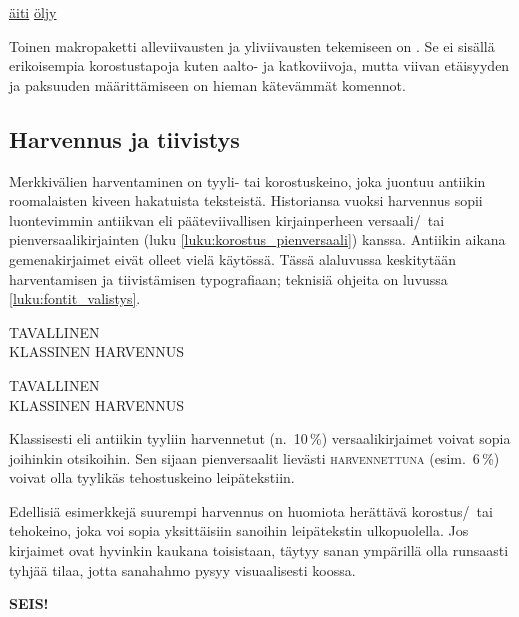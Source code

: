 \begin{tulossis}
  \setlength{\ULdepth}{.2ex}
  \renewcommand{\ULthickness}{.1ex}
  \uline{äiti} \uline{öljy}
\end{tulossis}

Toinen makropaketti alleviivausten ja yliviivausten tekemiseen on
. Se ei sisällä erikoisempia korostustapoja
kuten aalto- ja katkoviivoja, mutta viivan etäisyyden ja paksuuden
määrittämiseen on hieman kätevämmät komennot.

\subsection{Harvennus ja tiivistys}
\label{luku:korostus_harvennus}

Merkkivälien harventaminen on tyyli- tai korostuskeino, joka juontuu
antiikin roomalaisten kiveen hakatuista teksteistä. Historiansa vuoksi
harvennus sopii luontevimmin antiikvan eli pääteviivallisen
kirjainperheen versaali\-/\ tai pienversaalikirjainten (luku
\ref{luku:korostus_pienversaali}) kanssa. Antiikin aikana
gemenakirjaimet eivät olleet vielä käytössä. Tässä alaluvussa
keskitytään harventamisen ja tiivistämisen typografiaan; teknisiä
ohjeita on luvussa \ref{luku:fontit_valistys}.

\begin{koodilohkosis}
  \large TAVALLINEN \\
  { KLASSINEN HARVENNUS}
\end{koodilohkosis}

\begin{tulossis}
  \large
  TAVALLINEN \\
  { KLASSINEN HARVENNUS}
\end{tulossis}

Klassisesti eli antiikin tyyliin harvennetut (n.~10\,\%)
versaalikirjaimet voivat sopia joihinkin otsikoihin. Sen sijaan
pienversaalit lievästi {
  \textsc{harvennettuna}} (esim.~6\,\%) voivat olla tyylikäs
tehostuskeino leipätekstiin.

Edellisiä esimerkkejä suurempi harvennus on huomiota herättävä
korostus\-/\ tai tehokeino, joka voi sopia yksittäisiin sanoihin
leipätekstin ulkopuolella. Jos kirjaimet ovat hyvinkin kaukana
toisistaan, täytyy sanan ympärillä olla runsaasti tyhjää tilaa, jotta
sanahahmo pysyy visuaalisesti koossa.

\begin{koodilohkosis}
  {\sffamily\bfseries{} SEIS!}
\end{koodilohkosis}

